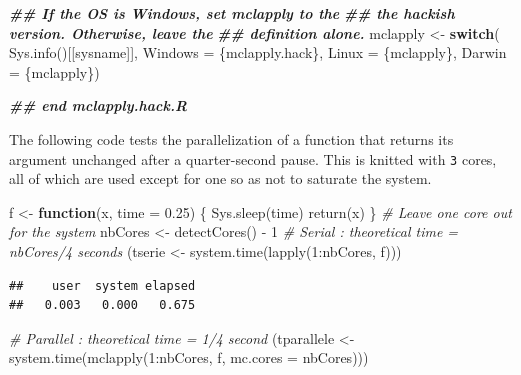 \documentclass[
  12pt,
  american,
  a4paper,
  extrafontsizes,onecolumn,openright
  ]{memoir}
\newenvironment{Shaded}{\begin{snugshade}}{\end{snugshade}}
\newcommand{\AttributeTok}[1]{\textcolor[rgb]{0.77,0.63,0.00}{#1}}
\newcommand{\CommentTok}[1]{\textcolor[rgb]{0.56,0.35,0.01}{\textit{#1}}}
\newcommand{\ControlFlowTok}[1]{\textcolor[rgb]{0.13,0.29,0.53}{\textbf{#1}}}
\newcommand{\DecValTok}[1]{\textcolor[rgb]{0.00,0.00,0.81}{#1}}
\newcommand{\DocumentationTok}[1]{\textcolor[rgb]{0.56,0.35,0.01}{\textbf{\textit{#1}}}}
\newcommand{\FloatTok}[1]{\textcolor[rgb]{0.00,0.00,0.81}{#1}}
\newcommand{\FunctionTok}[1]{\textcolor[rgb]{0.00,0.00,0.00}{#1}}
\newcommand{\NormalTok}[1]{#1}
\newcommand{\OtherTok}[1]{\textcolor[rgb]{0.56,0.35,0.01}{#1}}
\newcommand{\SpecialCharTok}[1]{\textcolor[rgb]{0.00,0.00,0.00}{#1}}
\newcommand{\StringTok}[1]{\textcolor[rgb]{0.31,0.60,0.02}{#1}}
\begin{document}
\begin{Shaded}
\begin{Highlighting}[]
\DocumentationTok{\#\# If the OS is Windows, set mclapply to the}
\DocumentationTok{\#\# the hackish version. Otherwise, leave the}
\DocumentationTok{\#\# definition alone. }
\NormalTok{mclapply }\OtherTok{\textless{}{-}} \ControlFlowTok{switch}\NormalTok{( }\FunctionTok{Sys.info}\NormalTok{()[[}\StringTok{\textquotesingle{}sysname\textquotesingle{}}\NormalTok{]],}
                    \AttributeTok{Windows =}\NormalTok{ \{mclapply.hack\}, }
                    \AttributeTok{Linux   =}\NormalTok{ \{mclapply\},}
                    \AttributeTok{Darwin  =}\NormalTok{ \{mclapply\})}

\DocumentationTok{\#\# end mclapply.hack.R}
\end{Highlighting}
\end{Shaded}

\normalsize

The following code tests the parallelization of a function that returns its argument unchanged after a quarter-second pause.
This is knitted with \texttt{3} cores, all of which are used except for one so as not to saturate the system.

\scriptsize

\begin{Shaded}
\begin{Highlighting}[]
\NormalTok{f }\OtherTok{\textless{}{-}} \ControlFlowTok{function}\NormalTok{(x, }\AttributeTok{time =} \FloatTok{0.25}\NormalTok{) \{}
    \FunctionTok{Sys.sleep}\NormalTok{(time)}
    \FunctionTok{return}\NormalTok{(x)}
\NormalTok{\}}
\CommentTok{\# Leave one core out for the system}
\NormalTok{nbCores }\OtherTok{\textless{}{-}} \FunctionTok{detectCores}\NormalTok{() }\SpecialCharTok{{-}} \DecValTok{1}
\CommentTok{\# Serial : theoretical time = nbCores/4 seconds}
\NormalTok{(tserie }\OtherTok{\textless{}{-}} \FunctionTok{system.time}\NormalTok{(}\FunctionTok{lapply}\NormalTok{(}\DecValTok{1}\SpecialCharTok{:}\NormalTok{nbCores, f)))}
\end{Highlighting}
\end{Shaded}

\begin{verbatim}
##    user  system elapsed 
##   0.003   0.000   0.675
\end{verbatim}

\begin{Shaded}
\begin{Highlighting}[]
\CommentTok{\# Parallel : theoretical time = 1/4 second}
\NormalTok{(tparallele }\OtherTok{\textless{}{-}} \FunctionTok{system.time}\NormalTok{(}\FunctionTok{mclapply}\NormalTok{(}\DecValTok{1}\SpecialCharTok{:}\NormalTok{nbCores, f, }\AttributeTok{mc.cores =}\NormalTok{ nbCores)))}
\end{Highlighting}
\end{Shaded}
\end{document}
